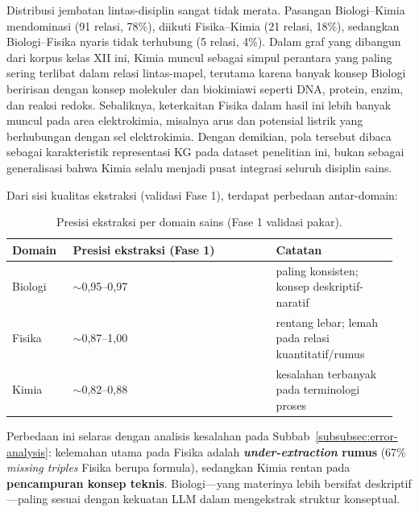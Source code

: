 \documentclass[../../thesis]{subfiles}
\begin{document}
Distribusi jembatan lintas-disiplin sangat tidak merata. Pasangan
Biologi--Kimia mendominasi (91 relasi, 78\%), diikuti Fisika--Kimia (21
relasi, 18\%), sedangkan Biologi--Fisika nyaris tidak terhubung (5
relasi, 4\%). Dalam graf yang dibangun dari korpus kelas XII ini, Kimia
muncul sebagai simpul perantara yang paling sering terlibat dalam relasi
lintas-mapel, terutama karena banyak konsep Biologi beririsan dengan konsep
molekuler dan biokimiawi seperti DNA, protein, enzim, dan reaksi redoks.
Sebaliknya, keterkaitan Fisika dalam hasil ini lebih banyak muncul pada area
elektrokimia, misalnya arus dan potensial listrik yang berhubungan dengan sel
elektrokimia. Dengan demikian, pola tersebut dibaca sebagai karakteristik
representasi KG pada dataset penelitian ini, bukan sebagai generalisasi bahwa
Kimia selalu menjadi pusat integrasi seluruh disiplin sains.

Dari sisi kualitas ekstraksi (validasi Fase 1), terdapat perbedaan
antar-domain:

\begin{table}[htbp]
\centering
\caption{Presisi ekstraksi per domain sains (Fase 1 validasi pakar).}
\label{tab:komparatif-domain}
\begin{tabular}{@{}
  >{\raggedright\arraybackslash}p{0.15\linewidth}
  >{\raggedright\arraybackslash}p{0.50\linewidth}
  >{\raggedright\arraybackslash}p{0.30\linewidth}@{}}
\toprule
\textbf{Domain} & \textbf{Presisi ekstraksi (Fase 1)} & \textbf{Catatan} \\
\midrule
Biologi & $\sim$0{,}95--0{,}97 & paling konsisten; konsep deskriptif-naratif \\
Fisika  & $\sim$0{,}87--1{,}00 & rentang lebar; lemah pada relasi kuantitatif/rumus \\
Kimia   & $\sim$0{,}82--0{,}88 & kesalahan terbanyak pada terminologi proses \\
\bottomrule
\end{tabular}
\end{table}

Perbedaan ini selaras dengan analisis kesalahan pada Subbab~\ref{subsubsec:error-analysis}:
kelemahan utama pada Fisika adalah \textbf{\textit{under-extraction} rumus} (67\%
\textit{missing triples} Fisika berupa formula), sedangkan Kimia rentan pada
\textbf{pencampuran konsep teknis}. Biologi---yang materinya lebih
bersifat deskriptif---paling sesuai dengan kekuatan LLM dalam mengekstrak
struktur konseptual.

\ifSubfilesClassLoaded{\printbibliography[title={Daftar Pustaka}]}{}
\end{document}
